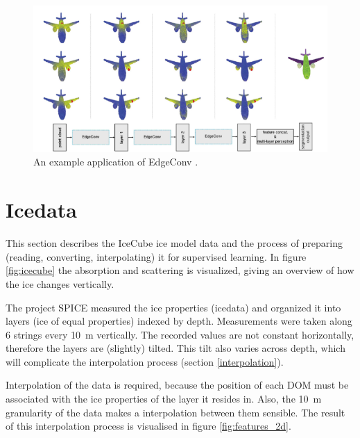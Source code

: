 \documentclass[a4paper,10pt]{scrartcl}
\begin{document}
\begin{figure}[h]
    \includegraphics[width=\textwidth]{images/edgeconv.png}
    \centering
    \caption{An example application of EdgeConv \cite{1801.07829}.}
    \label{fig:edgeconv}
\end{figure}


\section{Icedata}
\label{icedata}

This section describes the IceCube ice model data and the process of preparing (reading, converting, interpolating) it for supervised learning.
In figure \ref{fig:icecube} the absorption and scattering is visualized, giving an overview of how the ice changes vertically.

The project SPICE \cite{1301.5361} measured the ice properties (icedata) and organized it into layers (ice of equal properties) indexed by depth.
Measurements were taken along 6 strings every \SI{10}{m} vertically.
The recorded values are not constant horizontally, therefore the layers are (slightly) tilted.
This tilt also varies across depth, which will complicate the interpolation process (section \ref{interpolation}).

Interpolation of the data is required, because the position of each DOM must be associated with the ice properties of the layer it resides in.
Also, the \SI{10}{m} granularity of the data makes a interpolation between them sensible.
The result of this interpolation process is visualised in figure \ref{fig:features_2d}.
\end{document}
